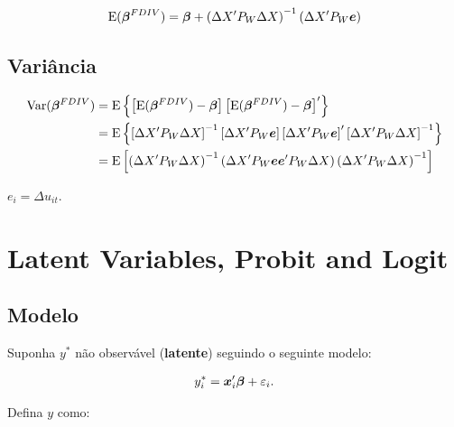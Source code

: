 \documentclass[11pt, oneside, a4paper, article]{article}
\numberwithin{equation}{section}
\begin{document}
\begin{description}
	\vspace{-1 em}
	\begin{align*}
		\text{E}( \boldsymbol{\beta}^{FDIV} ) =  
		\boldsymbol{\beta} + 
		\left( \Delta X' P_{W} \Delta X \right)^{-1}
		\left( \Delta X' P_{W} \boldsymbol{e} \right)
	\end{align*}

	\subsection{Variância}

	\vspace{-1 em}
	\begin{align*}
		\text{Var}( \boldsymbol{\beta}^{FDIV} ) &=
		\text{E}\left\{  
			\left[ \text{E}( \boldsymbol{\beta}^{FDIV} ) - \boldsymbol{\beta} \right] 
			\left[ \text{E}( \boldsymbol{\beta}^{FDIV} ) - \boldsymbol{\beta} \right]'
		\right\}
		\\
		&=
		\text{E}\left\{  
			\left[ \Delta X' P_{W} \Delta X \right]^{-1}
			\left[ \Delta X' P_{W} \boldsymbol{e} \right]
			\left[ \Delta X' P_{W} \boldsymbol{e} \right]'
			\left[ \Delta X' P_{W} \Delta X \right]^{-1}
		\right\}
		\\
		&=
		\text{E}\left[
			\left( \Delta X' P_{W} \Delta X \right)^{-1}
			\left( \Delta X' P_{W} \boldsymbol{e} \boldsymbol{e}' P_{W} \Delta X \right)
			\left( \Delta X' P_{W} \Delta X \right)^{-1}
		\right]
	\end{align*}

	\noindent
	$e_{i} = \Delta u_{it}$.

	\clearpage
	\section{Latent Variables, Probit and Logit}

	\subsection{Modelo}

	Suponha $y^{*}$ não observável (\textbf{latente}) seguindo o seguinte modelo:

	\vspace{-1 em}
	\begin{align} \label{mod1:probit}
		y_{i}^{*} = \boldsymbol{x}_{i}' \boldsymbol{\beta} + \varepsilon_{i}.
	\end{align}

	\noindent
	Defina $y$ como:


\end{description}
\end{document}
